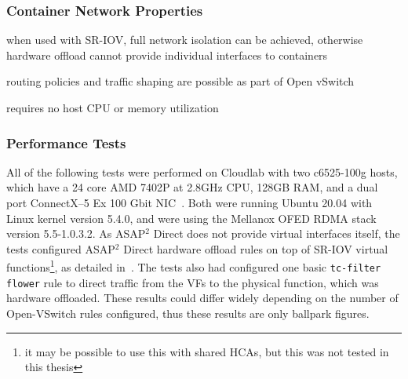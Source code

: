 \documentclass[12pt,titlepage]{article}
\begin{document}
\subsubsection*{Container Network Properties}
\begin{description}[nolistsep,font={{\scshape\bfseries}}]
	\item[Network Isolation] when used with SR-IOV, full network isolation can be achieved, otherwise hardware offload cannot provide individual interfaces to containers
	\item[Controllability] routing policies and traffic shaping are possible as part of Open vSwitch
	\item[Resource Utilization] requires no host CPU or memory utilization
\end{description}

\subsubsection*{Performance Tests}
All of the following tests were performed on Cloudlab with two c6525-100g hosts, which have a 24 core AMD 7402P at 2.8GHz CPU, 128GB RAM, and a dual port ConnectX--5 Ex 100 Gbit NIC~\cite{cloudlab}. 
Both were running Ubuntu 20.04 with Linux kernel version 5.4.0, and were using the Mellanox OFED RDMA stack version 5.5-1.0.3.2.
As ASAP$^2$ Direct does not provide virtual interfaces itself, the tests configured ASAP$^2$ Direct hardware offload rules on top of SR-IOV virtual functions\footnote{it may be possible to use this with shared HCAs, but this was not tested in this thesis}, as detailed in~\cite{mellanoxdockerovs}.
The tests also had configured one basic \texttt{tc-filter flower} rule to direct traffic from the VFs to the physical function, which was hardware offloaded.
These results could differ widely depending on the number of Open-VSwitch rules configured, thus these results are only ballpark figures.
\end{document}

